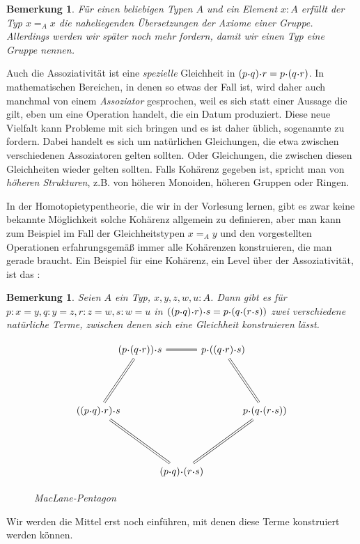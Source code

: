 \documentclass[a4paper,12pt]{article}
\theoremstyle{break}
\newtheorem{bemerkung}[theorem]{Bemerkung}
\theoremstyle{nonumberbreak}
\theoremstyle{nonumberplain}
\begin{document}
\begin{bemerkung}
  Für einen beliebigen Typen $A$ und ein Element $x:A$ erfüllt der Typ $x=_A x$ die naheliegenden Übersetzungen der Axiome einer Gruppe.
  Allerdings werden wir später noch mehr fordern, damit wir einen Typ eine Gruppe nennen.
\end{bemerkung}

Auch die Assoziativität ist eine \emph{spezielle} Gleichheit in $(p\kon q)\kon r = p \kon (q\kon r)$.
In mathematischen Bereichen, in denen so etwas der Fall ist, wird daher auch manchmal von einem \emph{Assoziator} gesprochen,
weil es sich statt einer Aussage die gilt, eben um eine Operation handelt, die ein Datum produziert.
Diese neue Vielfalt kann Probleme mit sich bringen und es ist daher üblich, sogenannte  zu fordern.
Dabei handelt es sich um natürlichen Gleichungen, die etwa zwischen verschiedenen Assoziatoren gelten sollten. Oder Gleichungen,
die zwischen diesen Gleichheiten wieder gelten sollten. Falls Kohärenz gegeben ist, spricht man von \emph{höheren Strukturen}, z.B. von höheren Monoiden, höheren Gruppen oder Ringen.

In der Homotopietypentheorie, die wir in der Vorlesung lernen, gibt es zwar keine bekannte Möglichkeit solche Kohärenz allgemein zu definieren, aber man kann zum Beispiel im Fall der Gleichheitstypen $x=_A y$
und den vorgestellten Operationen erfahrungsgemäß immer alle Kohärenzen konstruieren, die man gerade braucht.
Ein Beispiel für eine Kohärenz, ein Level über der Assoziativität, ist das :
\begin{bemerkung}
  Seien $A$ ein Typ, $x,y,z,w,u:A$.
  Dann gibt es für $p:x=y,q:y=z,r:z=w,s:w=u$ in $((p\kon q)\kon r)\kon s = p \kon (q\kon (r\kon s))$ zwei verschiedene natürliche Terme,
  zwischen denen sich eine Gleichheit konstruieren lässt.
  \begin{figure}
    \begin{equation}
      \begin{tikzcd}[column sep={between origins,1.5cm},row sep={between origins,2.2cm}]
        & (p \kon (q \kon r)) \kon s
          \arrow[rr,equal]
        && p \kon ((q \kon r) \kon s)
          \arrow[dr,equal]
        &
        \\
        ((p \kon q) \kon r) \kon s
          \arrow[ur,equal]
          \arrow[drr,equal]
        &&&& p \kon (q \kon (r \kon s))
        \\
        && (p \kon q) \kon (r \kon s)
          \arrow[urr,equal]
        &&
      \end{tikzcd}
    \end{equation}
    \caption{MacLane-Pentagon}
  \end{figure}
\end{bemerkung}
Wir werden die Mittel erst noch einführen, mit denen diese Terme konstruiert werden können.
\end{document}

